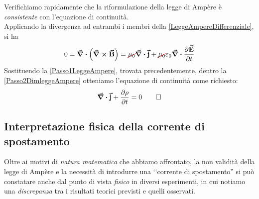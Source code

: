 \begin{demonstration}
	Verifichiamo rapidamente che la riformulazione della legge di Ampère è \textit{consistente} con l'equazione di continuità.\\ 
	Applicando la divergenza ad entrambi i membri della \eqref{LeggeAmpereDifferenziale}, si ha
	\begin{equation}
		0=\div{\left(\curl{\vba{B}}\right)}=\Ccancel[red]{\mu_0}\div{\vba{j}}+\Ccancel[red]{\mu_0}\epsilon_0\div{\pdv{\vba{E}}{t}}\label{Passo2DimleggeAmpere} 
	\end{equation}
	Sostituendo la \eqref{Passo1LeggeAmpere}, trovata precedentemente, dentro la \eqref{Passo2DimleggeAmpere} otteniamo l'equazione di continuità come richiesto:
	\begin{equation*}
		\div{\vb*{\va{j}}}+\pdv{\rho}{t}=0\qedhere
	\end{equation*}
\end{demonstration}
\subsection{Interpretazione fisica della corrente di spostamento}
Oltre ai motivi di \textit{natura matematica} che abbiamo affrontato, la non validità della legge di Ampère e la necessità di introdurre una ‘‘corrente di spostamento'' si può constatare anche dal punto di vista \textit{fisico} in diversi esperimenti, in cui notiamo una \textit{discrepanza} tra i risultati teorici previsti e quelli osservati.

